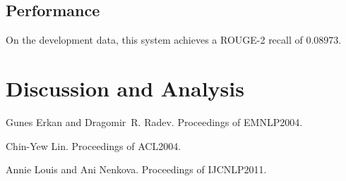 \documentclass[11pt,letterpaper]{article}
\begin{document}
\subsection{Performance}
On the development data, this system achieves a ROUGE-2 recall of 0.08973.

\section{Discussion and Analysis}

\begin{thebibliography}{}

Gunes Erkan and Dragomir~R. Radev.
\newblock Proceedings of EMNLP2004.

Chin-Yew Lin.
\newblock Proceedings of ACL2004.

Annie Louis and Ani Nenkova.
\newblock Proceedings of IJCNLP2011.

\end{thebibliography}
\end{document}
